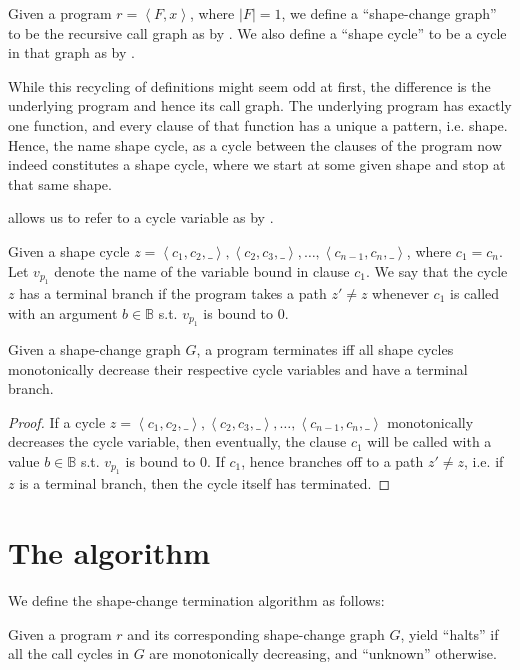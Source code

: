 \begin{definition}\label{definition:nice-4} Given a program $ r = \left\langle
F, x \right\rangle$, where $|F|=1$, we define a ``shape-change graph'' to be
the recursive call graph as by . We
also define a ``shape cycle'' to be a cycle in that graph as by
.\end{definition}

While this recycling of definitions might seem odd at first, the difference is
the underlying program and hence its call graph. The underlying program has
exactly one function, and every clause of that function has a unique a pattern,
i.e. shape. Hence, the name shape cycle, as a cycle between the clauses of the
program now indeed constitutes a shape cycle, where we start at some given
shape and stop at that same shape.

 allows us to refer to a cycle variable as by
.

\begin{definition} Given a shape cycle $z= \left\langle c_1,c_2,\_
\right\rangle, \left\langle c_2,c_3,\_ \right\rangle, \ldots, \left\langle
c_{n-1}, c_n,\_ \right\rangle$, where $c_1=c_n$. Let $v_{p_1}$ denote the name
of the variable bound in clause $c_1$. We say that the cycle $z$ has a terminal
branch if the program takes a path $z'\neq z$ whenever $c_1$ is called with an
argument $b\in\mathbb{B}$ s.t. $v_{p_1}$ is bound to $0$.\end{definition}

\begin{theorem} Given a shape-change graph $G$, a program terminates iff all
shape cycles monotonically decrease their respective cycle
variables and have a terminal branch.\end{theorem}

\begin{proof} If a cycle $z= \left\langle c_1,c_2,\_ \right\rangle,
\left\langle c_2,c_3,\_ \right\rangle, \ldots, \left\langle c_{n-1}, c_n,\_
\right\rangle$ monotonically decreases the cycle variable, then eventually, the
clause $c_1$ will be called with a value $b\in\mathbb{B}$ s.t. $v_{p_1}$ is
bound to $0$. If $c_1$, hence branches off to a path $z'\neq z$, i.e. if $z$ is
a terminal branch, then the cycle itself has terminated.\end{proof}

\section{The algorithm}

We define the shape-change termination algorithm as follows:

\begin{definition}\label{definition:shape-change-algorithm} Given a program $r$
and its corresponding shape-change graph $G$, yield ``halts'' if all the call
cycles in $G$ are monotonically decreasing, and ``unknown''
otherwise.\end{definition}
